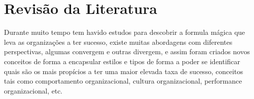 {
\newpage
\section{Revisão da Literatura}
\qquad Durante muito tempo tem havido estudos para descobrir a formula mágica que leva as organizações a ter sucesso, existe muitas abordagens com diferentes perspectivas, algumas convergem e outras divergem, e assim foram criados novos conceitos de forma a encapsular estilos e tipos de forma a poder se identificar quais são os mais propícios a ter uma maior elevada taxa de sucesso, conceitos tais como comportamento organizacional, cultura organizacional, performance organizacional, etc.\\









\newpage
}

